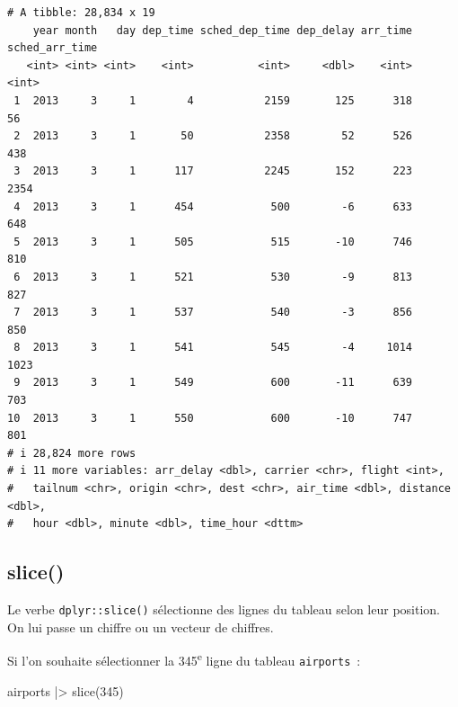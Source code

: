 \documentclass[
  letterpaper,
  DIV=11,
  numbers=noendperiod,
  oneside]{scrreprt}
\newenvironment{Shaded}{\begin{snugshade}}{\end{snugshade}}
\newcommand{\DecValTok}[1]{\textcolor[rgb]{0.68,0.00,0.00}{#1}}
\newcommand{\FunctionTok}[1]{\textcolor[rgb]{0.28,0.35,0.67}{#1}}
\newcommand{\NormalTok}[1]{\textcolor[rgb]{0.00,0.23,0.31}{#1}}
\newcommand{\OtherTok}[1]{\textcolor[rgb]{0.00,0.23,0.31}{#1}}
\newcommand{\SpecialCharTok}[1]{\textcolor[rgb]{0.37,0.37,0.37}{#1}}
\begin{document}
\begin{tcolorbox}
\begin{Shaded}
\end{Shaded}

\begin{verbatim}
# A tibble: 28,834 x 19
    year month   day dep_time sched_dep_time dep_delay arr_time sched_arr_time
   <int> <int> <int>    <int>          <int>     <dbl>    <int>          <int>
 1  2013     3     1        4           2159       125      318             56
 2  2013     3     1       50           2358        52      526            438
 3  2013     3     1      117           2245       152      223           2354
 4  2013     3     1      454            500        -6      633            648
 5  2013     3     1      505            515       -10      746            810
 6  2013     3     1      521            530        -9      813            827
 7  2013     3     1      537            540        -3      856            850
 8  2013     3     1      541            545        -4     1014           1023
 9  2013     3     1      549            600       -11      639            703
10  2013     3     1      550            600       -10      747            801
# i 28,824 more rows
# i 11 more variables: arr_delay <dbl>, carrier <chr>, flight <int>,
#   tailnum <chr>, origin <chr>, dest <chr>, air_time <dbl>, distance <dbl>,
#   hour <dbl>, minute <dbl>, time_hour <dttm>
\end{verbatim}

\end{tcolorbox}

\hypertarget{slice}{%
\subsection{slice()}\label{slice}}

Le verbe \texttt{dplyr::slice()} sélectionne des lignes du tableau selon
leur position. On lui passe un chiffre ou un vecteur de chiffres.

Si l'on souhaite sélectionner la 345\textsuperscript{e} ligne du tableau
\texttt{airports}~:

\begin{Shaded}
\begin{Highlighting}[]
\NormalTok{airports }\SpecialCharTok{|\textgreater{}} 
  \FunctionTok{slice}\NormalTok{(}\DecValTok{345}\NormalTok{)}
\end{Highlighting}
\end{Shaded}
\end{document}
